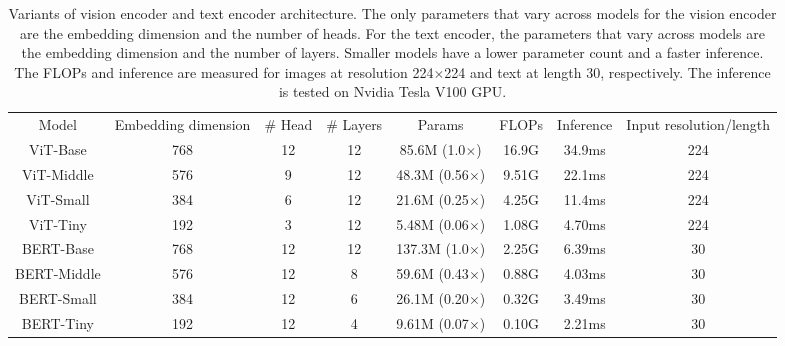 \documentclass[10pt,twocolumn,letterpaper]{article}
\begin{document}
  \begin{table}[t]
    \caption{Variants of vision encoder and text encoder architecture. The only parameters that vary across models for the vision encoder are the embedding dimension and the number of heads. For the text encoder, the parameters that vary across models are the embedding dimension and the number of layers. Smaller models have a lower parameter count and a faster inference. The FLOPs and inference are measured for images at resolution 224$\times$224 and text at length 30, respectively. 
    The inference is tested on Nvidia Tesla V100 GPU.}
    \label{model_cfg}
        \begin{small}
    \begin{center}
    \renewcommand\arraystretch{1.2}
    \setlength\tabcolsep{4.5pt}
    \begin{tabular}{c|ccccccc}
        \toprule
        \multirow{2}{1.5cm}{\centering Model}  & \multirow{2}{2.0cm}{ \centering Embedding dimension} & \multirow{2}{1.0cm}{ \centering \# Head} & \multirow{2}{1.5cm}{\centering \# Layers} & \multirow{2}{1.5cm}{\centering Params} & \multirow{2}{1.5cm}{\centering FLOPs} & \multirow{2}{1.5cm}{\centering Inference} & \multirow{2}{2.5cm}{\centering Input resolution/length} \\
        &  &  &  &  &  &  &  \\
        \toprule
        ViT-Base             & 768 & 12 & 12 & 85.6M (1.0$\times$) & 16.9G & 34.9ms & 224 \\
        ViT-Middle             & 576 & 9 & 12 & 48.3M (0.56$\times$) & 9.51G & 22.1ms & 224 \\
        ViT-Small                 & 384 & 6 & 12 & 21.6M (0.25$\times$) & 4.25G & 11.4ms & 224  \\
        ViT-Tiny                      & 192 & 3 & 12 & 5.48M (0.06$\times$) & 1.08G & 4.70ms & 224 \\
        \midrule
        BERT-Base                  & 768 & 12 & 12 & 137.3M (1.0$\times$) & 2.25G & 6.39ms & 30 \\
        BERT-Middle                  & 576 & 12 & 8 & 59.6M (0.43$\times$) & 0.88G & 4.03ms & 30 \\
        BERT-Small                  & 384 & 12 & 6 & 26.1M (0.20$\times$) & 0.32G & 3.49ms & 30\\
        BERT-Tiny               & 192 & 12 & 4 & 9.61M (0.07$\times$) & 0.10G & 2.21ms & 30 \\
        \bottomrule 
    \end{tabular}
    \end{center}
     \end{small}
    \vskip -0.2in
  \end{table}
\end{document}

